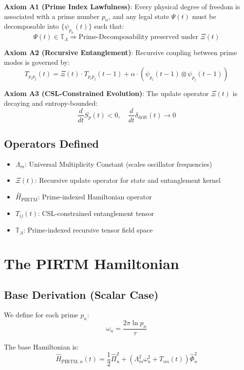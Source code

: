 \documentclass[11pt]{article}
\begin{document}
\textbf{Axiom A1 (Prime Index Lawfulness)}:  
Every physical degree of freedom is associated with a prime number $p_n$, and any legal state $\Psi(t)$ must be decomposable into $\{ \psi_{p_n}(t) \}$ such that:
\[
\Psi(t) \in \mathbb{T}_\Lambda \Rightarrow \text{Prime-Decomposability preserved under } \Xi(t)
\]

\textbf{Axiom A2 (Recursive Entanglement)}:  
Recursive coupling between prime modes is governed by:
\[
T_{p_i p_j}(t) = \Xi(t) \cdot T_{p_i p_j}(t-1) + \alpha \cdot \left( \psi_{p_i}(t-1) \otimes \psi_{p_j}(t-1) \right)
\]

\textbf{Axiom A3 (CSL-Constrained Evolution)}:  
The update operator $\Xi(t)$ is decaying and entropy-bounded:
\[
\frac{d}{dt} S_p(t) < 0, \quad \frac{d}{dt} \delta_{\text{drift}}(t) \rightarrow 0
\]

\subsection{Operators Defined}

\begin{itemize}
    \item $\Lambda_m$: Universal Multiplicity Constant (scales oscillator frequencies)
    \item $\Xi(t)$: Recursive update operator for state and entanglement kernel
    \item $\hat{H}_{\text{PIRTM}}$: Prime-indexed Hamiltonian operator
    \item $T_{ij}(t)$: CSL-constrained entanglement tensor
    \item $\mathbb{T}_\Lambda$: Prime-indexed recursive tensor field space
\end{itemize}

\section{The PIRTM Hamiltonian}

\subsection{Base Derivation (Scalar Case)}

We define for each prime $p_n$:
\[
\omega_n = \frac{2\pi \ln p_n}{\tau}
\]

The base Hamiltonian is:
\[
\hat{H}_{\text{PIRTM}, n}(t) = \frac{1}{2} \hat{\Pi}_n^2 + \left( \Lambda_m^2 \omega_n^2 + T_{nn}(t) \right) \hat{\Phi}_n^2
\]
\end{document}
